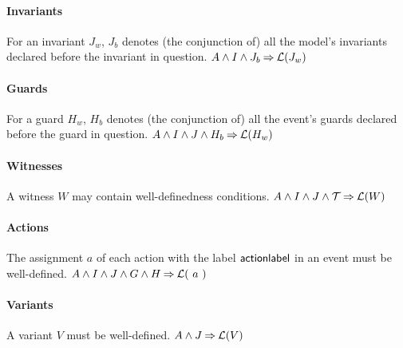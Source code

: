 \paragraph{Invariants}
\label{well_definedness_of_invariants}
For an invariant $J_w$, $J_b$ denotes (the conjunction of) all the model's 
  invariants declared before the invariant in question.
%
  {$A \land I \land J_b
    \mathbin\Rightarrow \mathcal{L}(J_w)$}

\paragraph{Guards}
\label{well_definedness_of_guards}
For a guard $H_w$, $H_b$ denotes (the conjunction of) all the event's
  guards declared before the guard in question.
%
  {$A \land I \land J \land H_b
    \mathbin\Rightarrow \mathcal{L}(H_w)$}

\paragraph{Witnesses}
\label{well_definedness_of_witnesses}
A witness $W$ may contain well-definedness conditions.
%
  {$A \land I \land J \land \mathcal{T}
    \mathbin\Rightarrow \mathcal{L}(W)$}

\paragraph{Actions}
\label{well_definedness_of_actions}
The assignment $a$ of each action with the label $\textsf{actionlabel}$ in
 an event must be well-defined.
%
  {}%
  {$A \land I \land J \land G \land H \mathbin\Rightarrow \mathcal{L}(~a~)$}

\paragraph{Variants}
\label{well_definedness_of_variants}
A variant $V$ must be well-defined.
%
  {$A \land J \mathbin\Rightarrow \mathcal{L}(V)$}


